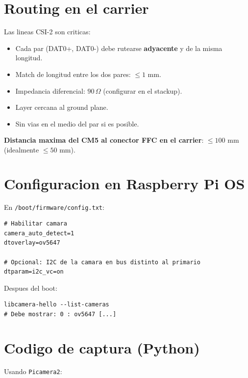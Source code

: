 \documentclass[11pt,a4paper,oneside,openright]{book}
\begin{document}
\section{Routing en el carrier}

Las lineas CSI-2 son criticas:

\begin{itemize}[leftmargin=2em]
  \item Cada par (DAT0+, DAT0-) debe rutearse \textbf{adyacente} y de la
        misma longitud.
  \item Match de longitud entre los dos pares: $\leq 1$ mm.
  \item Impedancia diferencial: $90\,\Omega$ (configurar en el stackup).
  \item Layer cercana al ground plane.
  \item Sin vias en el medio del par si es posible.
\end{itemize}

\textbf{Distancia maxima del CM5 al conector FFC en el carrier}: $\leq 100$ mm
(idealmente $\leq 50$ mm).

\section{Configuracion en Raspberry Pi OS}

En \texttt{/boot/firmware/config.txt}:

\begin{lstlisting}
# Habilitar camara
camera_auto_detect=1
dtoverlay=ov5647

# Opcional: I2C de la camara en bus distinto al primario
dtparam=i2c_vc=on
\end{lstlisting}

Despues del boot:

\begin{lstlisting}
libcamera-hello --list-cameras
# Debe mostrar: 0 : ov5647 [...]
\end{lstlisting}

\section{Codigo de captura (Python)}

Usando \texttt{Picamera2}:
\end{document}
